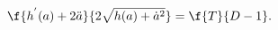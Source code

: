 \begin{equation}
\f{h^{'}(a)+2\ddot a}{2\sqrt{h(a)+{\dot a}^2}}=\f{T}{D-1}. 
\label{eqm}
\end{equation}

